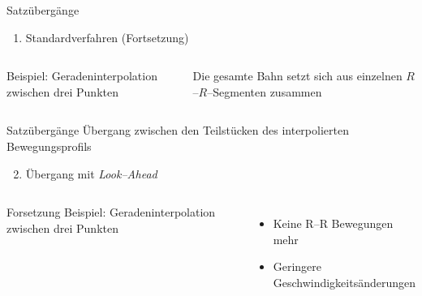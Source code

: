 \begin{frame}{Satzübergänge}
%
\begin{enumerate}
  \setcounter{enumi}{0}
  \item Standardverfahren (Fortsetzung)
\end{enumerate}
%
\vspace{6pt}
%
\begin{columns}
%
%
%

Beispiel: Geradeninterpolation zwischen drei Punkten

\vspace{6pt}

%

%

\vspace{6pt}
%

Die gesamte Bahn setzt sich aus einzelnen $R$--$R$--Segmenten zusammen

%
\end{columns}
%
\vspace{12pt}
%
\end{frame}
%
%
\begin{frame}{Satzübergänge}
%
Übergang zwischen den Teilstücken des interpolierten Bewegungsprofils
%
\begin{enumerate}
  \setcounter{enumi}{1}
  \item Übergang mit {\em Look--Ahead}
\end{enumerate}
%
\begin{columns}
%
%
%

Forsetzung Beispiel: Geradeninterpolation zwischen drei Punkten

\vspace{6pt}

%

%

\vspace{6pt}
%

\begin{itemize}
  \item Keine R--R Bewegungen mehr
  \item Geringere Geschwindigkeitsänderungen
\end{itemize}

%
\end{columns}
%
\vspace{12pt}
%
\end{frame}
%